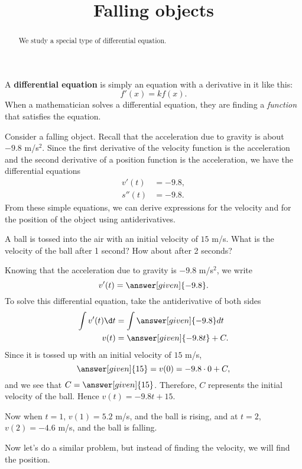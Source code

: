 \documentclass{ximera}
\title[Dig-In:]{Falling objects}
\begin{document}
\begin{abstract}
  We study a special type of differential equation.
\end{abstract}
\maketitle

A \textbf{differential equation} is simply an equation with a derivative in it like this:
\[
f'(x) = k f(x).
\]
When a mathematician solves a differential equation, they are finding
a \textit{function} that satisfies the equation.


Consider a falling object. Recall that the acceleration due to gravity is about $-9.8$
m/s$^2$. Since the first derivative of the velocity function 
is the acceleration and the
second derivative of a position function 
is the acceleration, we have the differential equations
\begin{align*}
v'(t) &=  -9.8,\\
s''(t) &=  -9.8.
\end{align*}
From these simple equations, we can derive expressions for the velocity
and for the position of the object using antiderivatives.


\begin{example}
A ball is tossed into the air with an initial velocity of $15$
m/s. What is the velocity of the ball after 1 second? How about after
2 seconds?
\begin{explanation}
Knowing that the acceleration due to gravity is $-9.8$ m/s$^2$, we write
\[
v'(t) = \answer[given]{-9.8}.
\]
To solve this differential equation, take the antiderivative of both sides
\begin{align*}
\int v'(t) \d t &= \int \answer[given]{-9.8} dt\\
v(t) &= \answer[given]{-9.8 t} + C.
\end{align*}
 Since it is
tossed up with an initial velocity of $15$ m/s, 
\[
\answer[given]{15} = v(0) = -9.8\cdot 0 + C,
\]
and we see that $C=\answer[given]{15}$. Therefore, $C$ represents the initial velocity of the ball.
Hence $v(t) = -9.8t + 15$. 

Now when $t=1$,
$v(1) = 5.2$ m/s, and the ball is rising, and at $t=2$, $v(2) = -4.6$ m/s,
and the ball is falling.
\end{explanation}
\end{example}

Now let's do a similar problem, but instead of finding the velocity,
we will find the position.
\end{document}
